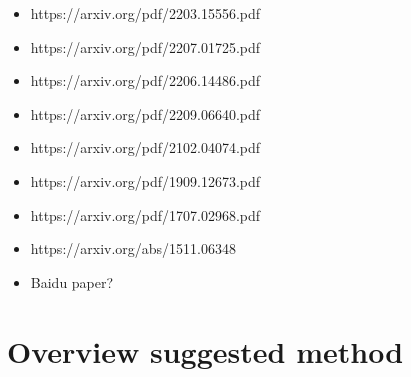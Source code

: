 \documentclass{article} %
\begin{document}
\cite{hoffmann2022training}
\cite{alabdulmohsin2022revisiting}
\cite{hutter2021learning}
\cite{mahmood2022data}
\cite{rosenfeld2019constructive}
\cite{sorscher2023neural}
\cite{sun2017revisiting}
\cite{cho2016data}

\begin{itemize}
    \item https://arxiv.org/pdf/2203.15556.pdf
    \item https://arxiv.org/pdf/2207.01725.pdf
    \item https://arxiv.org/pdf/2206.14486.pdf
    \item https://arxiv.org/pdf/2209.06640.pdf
    \item https://arxiv.org/pdf/2102.04074.pdf
    \item https://arxiv.org/pdf/1909.12673.pdf
    \item https://arxiv.org/pdf/1707.02968.pdf
    \item https://arxiv.org/abs/1511.06348
    \item Baidu paper?
\end{itemize}

\section{Overview suggested method}
\end{document}
